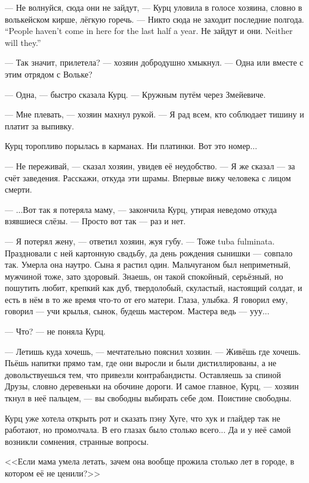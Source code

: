 --- Не волнуйся, сюда они не зайдут, --- Курц уловила в голосе хозяина, словно в волькейском кирше, лёгкую горечь.
{--- Никто сюда не заходит последние полгода.}
{``People haven't come in here for the last half a year.}
{Не зайдут и они.}
{Neither will they.''}

\asterism

--- Так значит, прилетела? --- хозяин добродушно хмыкнул.
--- Одна или вместе с этим отрядом с Вольке?

--- Одна, --- быстро сказала Курц.
--- Кружным путём через Змейевиче.

--- Мне плевать, --- хозяин махнул рукой.
--- Я рад всем, кто соблюдает тишину и платит за выпивку.

Курц торопливо порылась в карманах.
Ни платинки.
Вот это номер...

--- Не переживай, --- сказал хозяин, увидев её неудобство.
--- Я же сказал --- за счёт заведения.
Расскажи, откуда эти шрамы.
Впервые вижу человека с лицом смерти.

--- ...Вот так я потеряла маму, --- закончила Курц, утирая неведомо откуда взявшиеся слёзы.
--- Просто вот так --- раз и нет.

--- Я потерял жену, --- ответил хозяин, жуя губу.
--- Тоже tuba fulminata.
Праздновали с ней картонную свадьбу, да день рождения сынишки --- совпало так.
Умерла она наутро.
Сына я растил один.
Мальчуганом был неприметный, мужчиной тоже, зато здоровый.
Знаешь, он такой спокойный, серьёзный, но пошутить любит, крепкий как дуб, твердолобый, скуластый, настоящий солдат, и есть в нём в то же время что-то от его матери.
Глаза, улыбка.
Я говорил ему, говорил --- учи крылья, сынок, будешь мастером.
Мастера ведь --- ууу...

--- Что? --- не поняла Курц.

--- Летишь куда хочешь, --- мечтательно пояснил хозяин.
--- Живёшь где хочешь.
Пьёшь напитки прямо там, где они выросли и были дистиллированы, а не довольствуешься тем, что привезли контрабандисты.
Оставляешь за спиной Друзы, словно деревеньки на обочине дороги.
И самое главное, Курц, --- хозяин ткнул в неё пальцем, --- вы свободны выбирать себе дом.
Поистине свободны.

Курц уже хотела открыть рот и сказать пэну Хуге, что хук и глайдер так не работают, но промолчала.
В его глазах было столько всего...
Да и у неё самой возникли сомнения, странные вопросы.

<<Если мама умела летать, зачем она вообще прожила столько лет в городе, в котором её не ценили?>>

